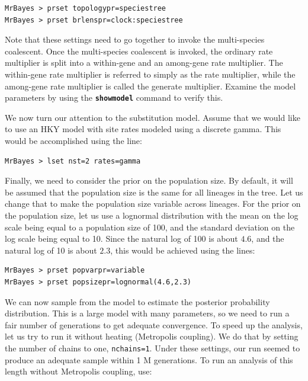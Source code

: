 \documentclass[12pt]{book}
\newcommand{\ttt}[1]{\texttt{#1}}
\newcommand{\tb}[1]{\ttt{\textbf{#1}}}
\begin{document}
\begin{singlespacing}
\small
\begin{verbatim}
MrBayes > prset topologypr=speciestree
MrBayes > prset brlenspr=clock:speciestree
\end{verbatim}
\end{singlespacing}
\normalsize

Note that these settings need to go together to invoke the multi-species coalescent. Once the
multi-species coalescent is invoked, the ordinary rate multiplier is split into a within-gene and
an among-gene rate multiplier. The within-gene rate multiplier is referred to simply as the rate
multiplier, while the among-gene rate multiplier is called the generate multiplier. Examine the
model parameters by using the \tb{showmodel} command to verify this.

We now turn our attention to the substitution model. Assume that we would like to use an HKY model
with site rates modeled using a discrete gamma. This would be accomplished using the line:

\begin{singlespacing}
\small
\begin{verbatim}
MrBayes > lset nst=2 rates=gamma
\end{verbatim}
\end{singlespacing}
\normalsize

Finally, we need to consider the prior on the population size. By default, it will be assumed that
the population size is the same for all lineages in the tree. Let us change that to make the
population size variable across lineages. For the prior on the population size, let us use a
lognormal distribution with the mean on the log scale being equal to a population size of 100, and
the standard deviation on the log scale being equal to 10. Since the natural log of 100 is about
$4.6$, and the natural log of 10 is about $2.3$, this would be achieved using the lines:

\begin{singlespacing}
\small
\begin{verbatim}
MrBayes > prset popvarpr=variable
MrBayes > prset popsizepr=lognormal(4.6,2.3)
\end{verbatim}
\end{singlespacing}
\normalsize

We can now sample from the model to estimate the posterior probability distribution. This is a
large model with many parameters, so we need to run a fair number of generations to get adequate
convergence. To speed up the analysis, let us try to run it without heating (Metropolis coupling).
We do that by setting the number of chains to one, \ttt{nchains=1}. Under these settings, our
run seemed to produce an adequate sample within 1 M generations. To run an analysis of this length
without Metropolis coupling, use:
\end{document}

